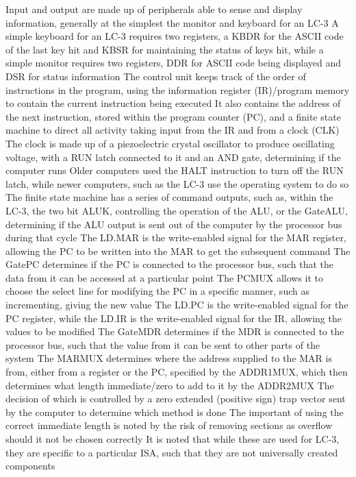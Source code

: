 \documentclass[11 pt, twoside]{article}
\newenvironment{outline*}
{
	\begin{outline}[enumerate]
	}
	{\end{outline}
}
\begin{document}
\begin{outline*}
\1 Input and output are made up of peripherals able to sense and display information, generally at the simplest the monitor and keyboard for an LC-3
\2 A simple keyboard for an LC-3 requires two registers, a KBDR for the ASCII code of the last key hit and KBSR for maintaining the status of keys hit, while a simple monitor requires two registers,  DDR for ASCII code being displayed and DSR for status information
\1 The control unit keeps track of the order of instructions in the program, using the information register (IR)/program memory to contain the current instruction being executed
\2 It also contains the address of the next instruction, stored within the program counter (PC), and a finite state machine to direct all activity taking input from the IR and from a clock (CLK)
\3 The clock is made up of a piezoelectric crystal oscillator to produce oscillating voltage, with a RUN latch connected to it and an AND gate, determining if the computer runs
\3 Older computers used the HALT instruction to turn off the RUN latch, while newer computers, such as the LC-3 use the operating system to do so
\2 The finite state machine has a series of command outputs, such as, within the LC-3, the two bit ALUK, controlling the operation of the ALU, or the GateALU, determining if the ALU output is sent out of the computer by the processor bus during that cycle
\3 The LD.MAR is the write-enabled signal for the MAR register, allowing the PC to be written into the MAR to get the subsequent command
\3 The GatePC determines if the PC is connected to the processor bus, such that the data from it can be accessed at a particular point
\3 The PCMUX allows it to choose the select line for modifying the PC in a specific manner, such as incrementing, giving the new value
\3 The LD.PC is the write-enabled signal for the PC register, while the LD.IR is the write-enabled signal for the IR, allowing the values to be modified
\3 The GateMDR determines if the MDR is connected to the processor bus, such that the value from it can be sent to other parts of the system
\3 The MARMUX determines where the address supplied to the MAR is from, either from a register or the PC, specified by the ADDR1MUX, which then determines what length immediate/zero to add to it by the ADDR2MUX
\4 The decision of which is controlled by a zero extended (positive sign) trap vector sent by the computer to determine which method is done
\4 The important of using the correct immediate length is noted by the risk of removing sections as overflow should it not be chosen correctly
\3 It is noted that while these are used for LC-3, they are specific to a particular ISA, such that they are not universally created components
\end{outline*}
\end{document}
